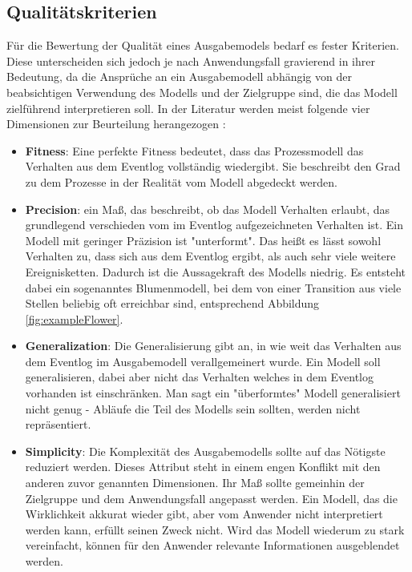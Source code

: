 \subsection{Qualitätskriterien}\label{quality}
Für die Bewertung der Qualität eines Ausgabemodels  bedarf es fester Kriterien. Diese unterscheiden sich jedoch je nach Anwendungsfall gravierend in ihrer Bedeutung, da die Ansprüche an ein Ausgabemodell abhängig von der beabsichtigen Verwendung des Modells und der Zielgruppe sind, die das Modell zielführend interpretieren soll. In der Literatur werden meist folgende vier Dimensionen zur Beurteilung herangezogen \cite{PMinAction}:

\begin{itemize}
\item \textbf{Fitness}: Eine perfekte Fitness bedeutet, dass das Prozessmodell das Verhalten aus dem Eventlog vollständig wiedergibt. Sie beschreibt den Grad zu dem Prozesse in der Realität vom Modell abgedeckt werden.
 
\item \textbf{Precision}: ein Maß, das beschreibt, ob das Modell Verhalten erlaubt, das grundlegend verschieden vom im Eventlog aufgezeichneten Verhalten ist. Ein Modell mit geringer Präzision ist "unterformt". Das heißt es lässt sowohl Verhalten zu, dass sich aus dem Eventlog ergibt, als auch sehr viele weitere Ereignisketten. Dadurch ist die Aussagekraft des Modells niedrig. Es entsteht dabei ein sogenanntes Blumenmodell, bei dem von einer Transition aus viele Stellen beliebig oft erreichbar sind, entsprechend Abbildung \ref{fig:exampleFlower}.

\item \textbf{Generalization}: Die Generalisierung gibt an, in wie weit das Verhalten aus dem Eventlog im Ausgabemodell verallgemeinert wurde. Ein Modell soll generalisieren, dabei aber nicht das Verhalten welches in dem Eventlog vorhanden ist einschränken. Man sagt ein "überformtes" Modell generalisiert nicht genug - Abläufe die Teil des Modells sein sollten, werden nicht repräsentiert.

\item \textbf{Simplicity}: Die Komplexität des Ausgabemodells sollte auf das Nötigste reduziert werden. Dieses Attribut steht in einem engen Konflikt mit den anderen zuvor genannten Dimensionen. Ihr Maß sollte gemeinhin der Zielgruppe und dem Anwendungsfall angepasst werden. Ein Modell, das die Wirklichkeit akkurat wieder gibt, aber vom Anwender nicht interpretiert werden kann, erfüllt seinen Zweck nicht. Wird das Modell wiederum zu stark vereinfacht, können für den Anwender relevante Informationen ausgeblendet werden.
\end{itemize}

